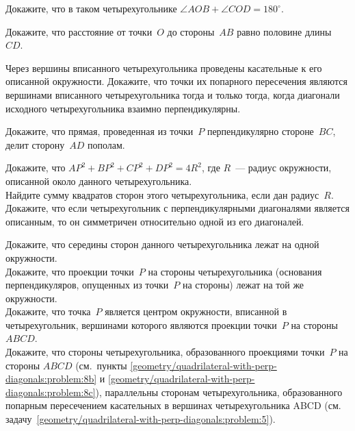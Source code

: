 \begin{problems}

\item
Докажите, что в таком четырехугольнике $\angle AOB + \angle COD = 180^\circ$.

\item
Докажите, что расстояние от точки~$O$ до стороны~$AB$ равно половине
длины~$CD$.

\item
\label{geometry/quadrilateral-with-perp-diagonals:problem:5}%
Через вершины вписанного четырехугольника проведены касательные к его описанной
окружности.
Докажите, что точки их попарного пересечения являются вершинами вписанного
четырехугольника тогда и только тогда, когда диагонали исходного
четырехугольника взаимно перпендикулярны.

\item
Докажите, что прямая, проведенная из точки~$P$ перпендикулярно стороне~$BC$,
делит сторону~$AD$ пополам.

\item
\subproblem
Докажите, что $AP^2 + BP^2 + CP^2 + DP^2 = 4 R^2$, где $R$~--- радиус
окружности, описанной около данного четырехугольника.
\\
\subproblem
Найдите сумму квадратов сторон этого четырехугольника, если дан радиус~$R$.
\\
\subproblem
\label{geometry/quadrilateral-with-perp-diagonals:problem:7c}%
Докажите, что если четырехугольник с перпендикулярными диагоналями является
описанным, то он симметричен относительно одной из его диагоналей.

\item
\subproblem
Докажите, что середины сторон данного четырехугольника лежат на одной
окружности.
\\
\subproblem
\label{geometry/quadrilateral-with-perp-diagonals:problem:8b}%
Докажите, что проекции точки~$P$ на стороны четырехугольника (основания
перпендикуляров, опущенных из точки~$P$ на стороны) лежат на той же окружности.
\\
\subproblem
\label{geometry/quadrilateral-with-perp-diagonals:problem:8c}%
Докажите, что точка~$P$ является центром окружности, вписанной
в четырехугольник, вершинами которого являются проекции точки~$P$
на стороны $ABCD$.
\\
\subproblem
Докажите, что стороны четырехугольника, образованного проекциями точки~$P$
на стороны $ABCD$
(см.~пункты \ref{geometry/quadrilateral-with-perp-diagonals:problem:8b}
и \ref{geometry/quadrilateral-with-perp-diagonals:problem:8c}),
параллельны сторонам четырехугольника, образованного попарным пересечением
касательных в вершинах четырехугольника ABCD
(см. задачу~\ref{geometry/quadrilateral-with-perp-diagonals:problem:5}).

\end{problems}

